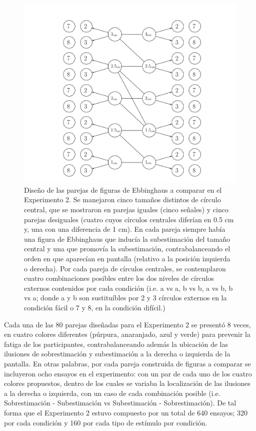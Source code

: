 \begin{itemize}
\begin{figure}[th]
\centering
\includegraphics[width=1.2\textwidth]{Figures/Estimulos_Experimento2} 
\decoRule
\caption[Diseño de Estimulos en el Experimento 2]{Diseño de las parejas  de figuras de Ebbinghaus a comparar en el Experimento 2. Se manejaron cinco tamaños distintos de círculo central, que se mostraron en parejas iguales (cinco señales) y cinco parejas desiguales (cuatro cuyos círculos centrales diferían en 0.5 cm y, una con una diferencia de 1 cm). En cada pareja siempre había una figura de Ebbinghaus que inducía la subestimación del tamaño central y una que promovía la subestimación, contrabalanceando el orden en que aparecían en pantalla (relativo a la posición izquierda o derecha). Por cada pareja de círculos centrales, se contemplaron cuatro combinaciones posibles entre los dos niveles de círculos externos contenidos por cada condición (i.e. a vs a, b vs b, a vs b, b vs a; donde a y b son sustituíbles por 2 y 3 círculos externos en la condición fácil o 7 y 8, en la condición difícil.)}
\label{fig:Exp_2}
\end{figure}
\end{itemize}

Cada una de las 80 parejas diseñadas para el Experimento 2 se presentó 8 veces, en cuatro colores diferentes (púrpura, anaranjado, azul y verde) para prevenir la fatiga de los participantes, contrabalanceando además la ubicación de las ilusiones de sobrestimación y subestimación a la derecha o izquierda de la pantalla. En otras palabras, por cada pareja construida de figuras a comparar se incluyeron ocho ensayos en el experimento: con un par de cada uno de los cuatro colores propuestos, dentro de los cuales se variaba la localización de las ilusiones a la derecha o izquierda, con un caso de cada combinación posible (i.e. Sobrestimación - Subestimación vs Subestimación - Sobrestimación). De tal forma que el Experimento 2 estuvo compuesto por un total de 640 ensayos; 320 por cada condición y 160 por cada tipo de estímulo por condición.\\ 

